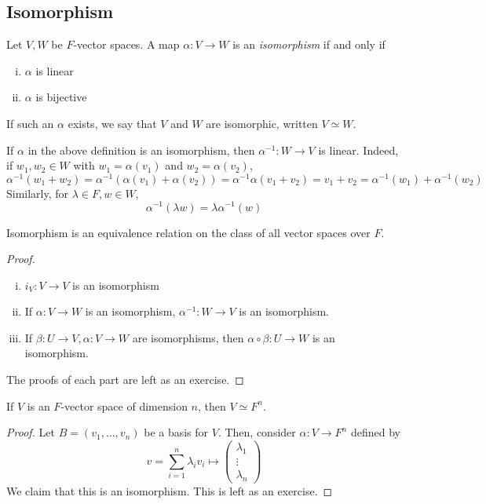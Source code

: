 \subsection{Isomorphism}
\begin{definition}
	Let \( V, W \) be \( F \)-vector spaces.
	A map \( \alpha \colon V \to W \) is an \textit{isomorphism} if and only if
	\begin{enumerate}[(i)]
		\item \( \alpha \) is linear
		\item \( \alpha \) is bijective
	\end{enumerate}
	If such an \( \alpha \) exists, we say that \( V \) and \( W \) are isomorphic, written \( V \simeq W \).
\end{definition}
\begin{remark}
	If \( \alpha \) in the above definition is an isomorphism, then \( \alpha^{-1} \colon W \to V \) is linear.
	Indeed, if \( w_1, w_2 \in W \) with \( w_1 = \alpha(v_1) \) and \( w_2 = \alpha(v_2) \),
	\[
		\alpha^{-1} (w_1 + w_2) = \alpha^{-1} (\alpha(v_1) + \alpha(v_2)) = \alpha^{-1} \alpha (v_1 + v_2) = v_1 + v_2 = \alpha^{-1}(w_1) + \alpha^{-1}(w_2)
	\]
	Similarly, for \( \lambda \in F, w \in W \),
	\[
		\alpha^{-1}(\lambda w) = \lambda \alpha^{-1}(w)
	\]
\end{remark}
\begin{lemma}
	Isomorphism is an equivalence relation on the class of all vector spaces over \( F \).
\end{lemma}
\begin{proof}
	\begin{enumerate}[(i)]
		\item \( i_V \colon V \to V \) is an isomorphism
		\item If \( \alpha \colon V \to W \) is an isomorphism, \( \alpha^{-1} \colon W \to V \) is an isomorphism.
		\item If \( \beta \colon U \to V, \alpha \colon V \to W \) are isomorphisms, then \( \alpha \circ \beta \colon U \to W \) is an isomorphism.
	\end{enumerate}
	The proofs of each part are left as an exercise.
\end{proof}
\begin{theorem}
	If \( V \) is an \( F \)-vector space of dimension \( n \), then \( V \simeq F^n \).
\end{theorem}
\begin{proof}
	Let \( B = (v_1, \dots, v_n) \) be a basis for \( V \).
	Then, consider \( \alpha \colon V \to F^n \) defined by
	\[
		v = \sum_{i=1}^n \lambda_i v_i \mapsto \begin{pmatrix}\lambda_1 \\ \vdots \\ \lambda_n \end{pmatrix}
	\]
	We claim that this is an isomorphism.
	This is left as an exercise.
\end{proof}
